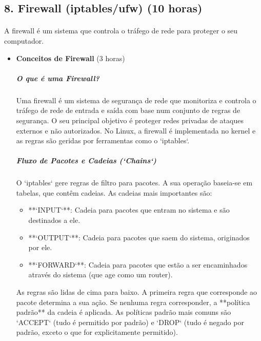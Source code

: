 \documentclass[10pt,a4paper]{article}
\begin{document}
	\subsection*{8. Firewall (iptables/ufw) (10 horas)}
	\vspace{-1em}
	\paragraph{}
	A firewall é um sistema que controla o tráfego de rede para proteger o seu computador.
	
	\begin{itemize}
		\item \textbf{Conceitos de Firewall} (3 horas)
		\subparagraph{O que é uma Firewall?} Uma firewall é um sistema de segurança de rede que monitoriza e controla o tráfego de rede de entrada e saída com base num conjunto de regras de segurança. O seu principal objetivo é proteger redes privadas de ataques externos e não autorizados. No Linux, a firewall é implementada no kernel e as regras são geridas por ferramentas como o `iptables`.
		
		\subparagraph{Fluxo de Pacotes e Cadeias (`Chains`)} O `iptables` gere regras de filtro para pacotes. A sua operação baseia-se em tabelas, que contêm cadeias. As cadeias mais importantes são:
		\begin{itemize}
			\item **`INPUT`**: Cadeia para pacotes que entram no sistema e são destinados a ele.
			\item **`OUTPUT`**: Cadeia para pacotes que saem do sistema, originados por ele.
			\item **`FORWARD`**: Cadeia para pacotes que estão a ser encaminhados através do sistema (que age como um router).
		\end{itemize}
		As regras são lidas de cima para baixo. A primeira regra que corresponde ao pacote determina a sua ação. Se nenhuma regra corresponder, a **política padrão** da cadeia é aplicada. As políticas padrão mais comuns são `ACCEPT` (tudo é permitido por padrão) e `DROP` (tudo é negado por padrão, exceto o que for explicitamente permitido).
		

\end{itemize}
\end{document}
